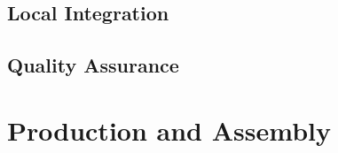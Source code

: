 \subsection{Local Integration}
\label{sec:fdsp-slow-cryo-slow-loc-integ}

\subsection{Quality Assurance}
\label{sec:fdsp-slow-cryo-slow-qa}


\section{Production and Assembly}
\label{sec:fdsp-slow-cryo-prod-assy}


